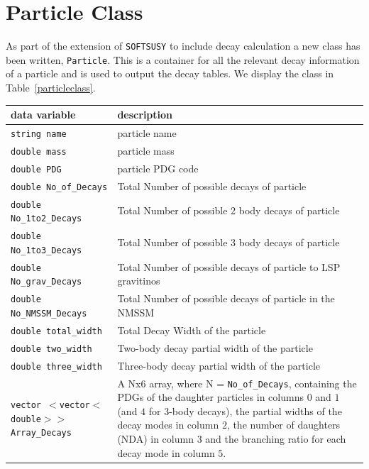 \documentclass[final,3p,times,pdflatex]{elsarticle}
\def\code#1{{\tt #1}}
\begin{document}
\section{Particle Class} \label{sec:particle}
As part of the extension of \code{SOFTSUSY} to include decay calculation a
new class has been written, {\tt Particle}. This is a container for all the
relevant decay information of a particle and is used to output the decay
tables. We display the class in Table~\ref{particleclass}.


\begin{center}
\begin{table} %
\centering
\begin{tabular}{|C|D|} \hline
data variable & description \\ \hline
{\tt string name} & particle name \\ \hline
{\tt double mass} & particle mass \\ \hline
{\tt double PDG} & particle PDG code \\ \hline
{\tt double No{\_}of{\_}Decays} & Total Number of possible decays of particle \\ \hline
{\tt double No{\_}1to2{\_}Decays} & Total Number of possible 2 body decays of particle \\ \hline
{\tt double No{\_}1to3{\_}Decays} & Total Number of possible 3 body decays of particle \\ \hline
{\tt double No{\_}grav{\_}Decays} & Total Number of possible decays of particle to LSP gravitinos \\ \hline
{\tt double No{\_}NMSSM{\_}Decays} & Total Number of possible decays of particle in the NMSSM \\ \hline
{\tt double total{\_}width} & Total Decay Width of the particle \\ \hline
{\tt double two{\_}width} & Two-body decay partial width of the particle \\ \hline
{\tt double three{\_}width} & Three-body decay partial width of the particle \\ \hline
{\tt vector $<$vector$<$double$>>$ Array{\_}Decays} & A Nx6 array, where N = {\tt No{\_}of{\_}Decays}, containing the PDGs of the daughter particles in columns $0$ and $1$ (and $4$ for 3-body decays), the partial widths of the decay modes in column $2$, the number of daughters (NDA) in column $3$ and the branching ratio for each decay mode in column $5$. \\ \hline

\end{tabular}
\end{table}
\end{center}
\end{document}
